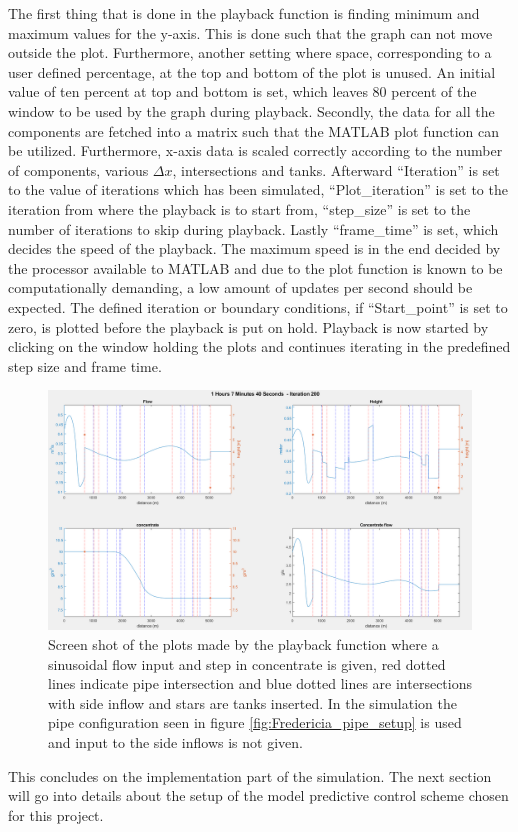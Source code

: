 The first thing that is done in the playback function is finding minimum and maximum values for the y-axis. This is done such that the graph can not move outside the plot. Furthermore, another setting where space, corresponding to a user defined percentage, at the top and bottom of the plot is unused. An initial value of ten percent at top and bottom is set, which leaves 80 percent of the window to be used by the graph during playback.  
Secondly, the data for all the components are fetched into a matrix such that the MATLAB plot function can be utilized. Furthermore, x-axis data is scaled correctly according to the number of components, various $\Delta x$, intersections and tanks. Afterward ``Iteration'' is set to the value of iterations which has been simulated, ``Plot\_iteration'' is set to the iteration from where the playback is to start from, ``step\_size'' is set to the number of iterations to skip during playback. Lastly ``frame\_time'' is set, which decides the speed of the playback. The maximum speed is in the end decided by the processor available to MATLAB and due to the plot function is known to be computationally demanding, a low amount of updates per second should be expected. The defined iteration or boundary conditions, if ``Start\_point'' is set to zero, is plotted before the playback is put on hold. Playback is now started by clicking on the window holding the plots and continues iterating in the predefined step size and frame time.


 \begin{figure}
 \centering
 \includegraphics[width=1.0 \textwidth]{report/simulation/pictures/display_result_matlab.png}
 \caption{Screen shot of the plots made by the playback function where a sinusoidal flow input and step in concentrate is given, red dotted lines indicate pipe intersection and blue dotted lines are intersections with side inflow and stars are tanks inserted. In the simulation the pipe configuration seen in figure \ref{fig:Fredericia_pipe_setup} is used and input to the side inflows is not given.}
 \label{fig:display_result_matlab}
 \end{figure}

This concludes on the implementation part of the simulation. The next section will go into details about the setup of the model predictive control scheme chosen for this project.
